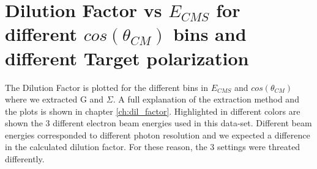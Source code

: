 \begin{figure}[htb]
\ContinuedFloat
  \begin{center} 
  \end{center}
\end{figure}


\clearpage
\newpage

\section{Dilution Factor vs \texorpdfstring{$E_{CMS}$}{E-CMS} for different \texorpdfstring{$cos(\theta_{CM})$}{cos(theta-CM)} bins and different Target polarization}
\label{app:dilfactor}
The Dilution Factor is plotted  for the different bins in $E_{CMS}$ and $cos(\theta_{CM})$ where we extracted G and $\Sigma$. A full explanation of the extraction method and the plots is shown in chapter \ref{ch:dil_factor}. Highlighted in different colors are shown the 3 different electron beam energies used in this data-set. Different beam energies corresponded to different photon resolution and we expected a difference in the calculated dilution factor. For these reason, the 3 settings were threated differently. 
\begin{figure}[htb]
  \begin{center}
     \\
  \end{center}
\end{figure}

